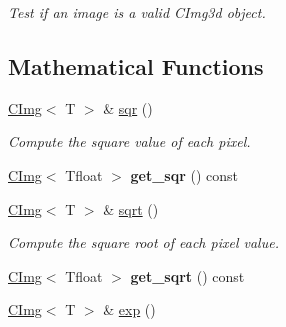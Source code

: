\begin{DoxyCompactItemize}
\begin{DoxyCompactList}\small\item\em Test if an image is a valid CImg3d object. \item\end{DoxyCompactList}\end{DoxyCompactItemize}
\subsection*{Mathematical Functions}
\label{_amgrp2cea901d85d98e5ef43355db4a654e99}
 \begin{DoxyCompactItemize}
\item 
\hypertarget{structcimg__library_1_1CImg_a19ebb696e513b9246864e5b0cdd884f5}{
\hyperlink{structcimg__library_1_1CImg}{CImg}$<$ T $>$ \& \hyperlink{structcimg__library_1_1CImg_a19ebb696e513b9246864e5b0cdd884f5}{sqr} ()}
\label{structcimg__library_1_1CImg_a19ebb696e513b9246864e5b0cdd884f5}

\begin{DoxyCompactList}\small\item\em Compute the square value of each pixel. \item\end{DoxyCompactList}\item 
\hypertarget{structcimg__library_1_1CImg_ae89b55c8ad61aafa8e43dadbeccd1cea}{
\hyperlink{structcimg__library_1_1CImg}{CImg}$<$ Tfloat $>$ {\bfseries get\_\-sqr} () const }
\label{structcimg__library_1_1CImg_ae89b55c8ad61aafa8e43dadbeccd1cea}

\item 
\hypertarget{structcimg__library_1_1CImg_a8c11d16e75e931e9e28d44171e7038d3}{
\hyperlink{structcimg__library_1_1CImg}{CImg}$<$ T $>$ \& \hyperlink{structcimg__library_1_1CImg_a8c11d16e75e931e9e28d44171e7038d3}{sqrt} ()}
\label{structcimg__library_1_1CImg_a8c11d16e75e931e9e28d44171e7038d3}

\begin{DoxyCompactList}\small\item\em Compute the square root of each pixel value. \item\end{DoxyCompactList}\item 
\hypertarget{structcimg__library_1_1CImg_add59f6d3b8557b7025bb778505d9028f}{
\hyperlink{structcimg__library_1_1CImg}{CImg}$<$ Tfloat $>$ {\bfseries get\_\-sqrt} () const }
\label{structcimg__library_1_1CImg_add59f6d3b8557b7025bb778505d9028f}

\item 
\hypertarget{structcimg__library_1_1CImg_a63fc5244a596810f4bba36a46787c6f2}{
\hyperlink{structcimg__library_1_1CImg}{CImg}$<$ T $>$ \& \hyperlink{structcimg__library_1_1CImg_a63fc5244a596810f4bba36a46787c6f2}{exp} ()}
\label{structcimg__library_1_1CImg_a63fc5244a596810f4bba36a46787c6f2}


\end{DoxyCompactItemize}
